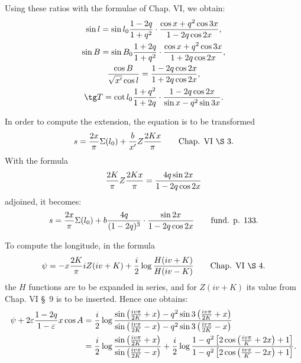 \begingroup\small
{}

Using these ratios with the formulae of Chap. VI, we obtain:
\[
\begin{gathered}
\sin l=\sin l_0{1-2q\over1+q^2}\cdot{\cos x+q^2\cos3x\over1-2q\cos2x},\\
\sin B=\sin B_0{1+2q\over1+q^2}\cdot{\cos x+q^2\cos3x\over1+2q\cos2x},\\
{\cos B\over\sqrt{x'}\cos l}={1-2q\cos2x\over1+2q\cos2x},\\
\tg T=\cot l_0{1+q^2\over1+2q}\cdot{1-2q\cos2x\over\sin x-q^2\sin3x}.
\end{gathered}
\]


In order to compute the extension, the equation is to be transformed
\[
 s={2x\over\pi}\Sigma(l_0)+{b\over x'}Z{2Kx\over\pi}
 \qquad\text{Chap. VI \S\ 3.}
\]
With the formula
\[
 {2K\over\pi}Z{2Kx\over\pi}={4q\sin2x\over1-2q\cos2x}
\]
adjoined, it becomes:
\[
 s={2x\over\pi}\Sigma(l_0)+b{4q\over(1-2q)^3}\cdot{\sin2x\over1-2q\cos2x}
 \qquad\text{fund. p. 133.}
\]


To compute the longitude, in the formula
\[
 \psi=-x{2K\over\pi}iZ(iv+K)+{i\over2}\log{H(iv+K)\over H(iv-K)}
 \qquad\text{Chap. VI \S\ 4.}
\]
the $H$ functions are to be expanded in series, and for $Z(iv+K)$ its value from Chap. VI \S\ 9 is to be inserted. Hence one obtains:
\[
\begin{aligned}
\psi+2\varepsilon{1-2q\over1-\varepsilon}x\cos A
&={i\over2}\log{\sin\left({iv\pi\over2K}+x\right)-q^2\sin3\left({iv\pi\over2K}+x\right)
\over
\sin\left({iv\pi\over2K}-x\right)-q^2\sin3\left({iv\pi\over2K}-x\right)}\\
&={i\over2}\log{\sin\left({iv\pi\over2K}+x\right)\over\sin\left({iv\pi\over2K}-x\right)}
+{i\over2}\log{1-q^2\left[2\cos\left({iv\pi\over K}+2x\right)+1\right]
\over
1-q^2\left[2\cos\left({iv\pi\over K}-2x\right)+1\right]}.
\end{aligned}
\]
\endgroup
